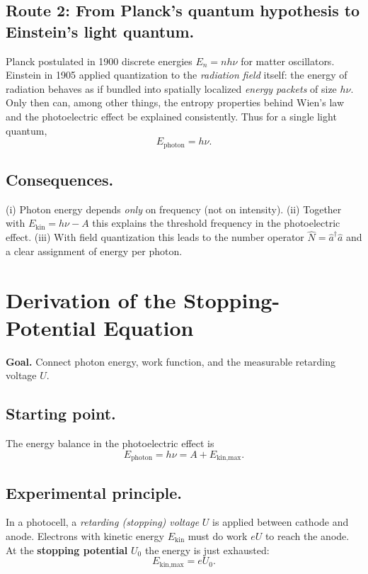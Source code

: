 \subsection*{Route 2: From Planck’s quantum hypothesis to Einstein’s light quantum.}
Planck postulated in 1900 discrete energies \(E_n=n h\nu\) for matter oscillators. 
Einstein in 1905 applied quantization to the \emph{radiation field} itself: the energy of radiation behaves as if bundled into spatially localized \emph{energy packets} of size \(h\nu\). 
Only then can, among other things, the entropy properties behind Wien’s law and the photoelectric effect be explained consistently. 
Thus for a single light quantum,
\[
E_{\text{photon}} = h\nu .
\]

\subsection*{Consequences.}
(i) Photon energy depends \emph{only} on frequency (not on intensity). 
(ii) Together with \(E_{\text{kin}}=h\nu-A\) this explains the threshold frequency in the photoelectric effect. 
(iii) With field quantization this leads to the number operator \(\hat N=\hat a^\dagger \hat a\) and a clear assignment of energy per photon.

\section{Derivation of the Stopping-Potential Equation}
\label{anhangA:stoppspannung}

\textbf{Goal.} Connect photon energy, work function, and the measurable retarding voltage \(U\).

\subsection*{Starting point.}
The energy balance in the photoelectric effect is
\[
E_{\text{photon}} = h\nu = A + E_{\text{kin,max}}.
\]

\subsection*{Experimental principle.}
In a photocell, a \emph{retarding (stopping) voltage} \(U\) is applied between cathode and anode.  
Electrons with kinetic energy \(E_{\text{kin}}\) must do work \(eU\) to reach the anode.  
At the \textbf{stopping potential} \(U_0\) the energy is just exhausted:
\[
E_{\text{kin,max}} = eU_0.
\]

